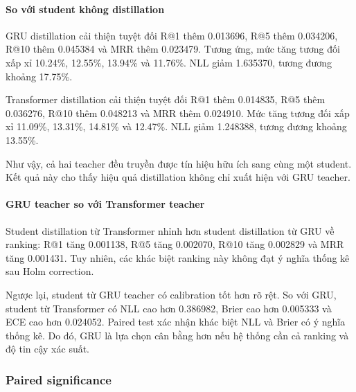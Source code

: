 \paragraph{So với student không distillation}

GRU distillation cải thiện tuyệt đối R@1 thêm 0.013696, R@5 thêm 0.034206, R@10 thêm 0.045384 và MRR thêm 0.023479. Tương ứng, mức tăng tương đối xấp xỉ 10.24\%, 12.55\%, 13.94\% và 11.76\%. NLL giảm 1.635370, tương đương khoảng 17.75\%.

Transformer distillation cải thiện tuyệt đối R@1 thêm 0.014835, R@5 thêm 0.036276, R@10 thêm 0.048213 và MRR thêm 0.024910. Mức tăng tương đối xấp xỉ 11.09\%, 13.31\%, 14.81\% và 12.47\%. NLL giảm 1.248388, tương đương khoảng 13.55\%.

Như vậy, cả hai teacher đều truyền được tín hiệu hữu ích sang cùng một student. Kết quả này cho thấy hiệu quả distillation không chỉ xuất hiện với GRU teacher.

\paragraph{GRU teacher so với Transformer teacher}

Student distillation từ Transformer nhỉnh hơn student distillation từ GRU về ranking: R@1 tăng 0.001138, R@5 tăng 0.002070, R@10 tăng 0.002829 và MRR tăng 0.001431. Tuy nhiên, các khác biệt ranking này không đạt ý nghĩa thống kê sau Holm correction.

Ngược lại, student từ GRU teacher có calibration tốt hơn rõ rệt. So với GRU, student từ Transformer có NLL cao hơn 0.386982, Brier cao hơn 0.005333 và ECE cao hơn 0.024052. Paired test xác nhận khác biệt NLL và Brier có ý nghĩa thống kê. Do đó, GRU là lựa chọn cân bằng hơn nếu hệ thống cần cả ranking và độ tin cậy xác suất.

\subsubsection*{Paired significance}

